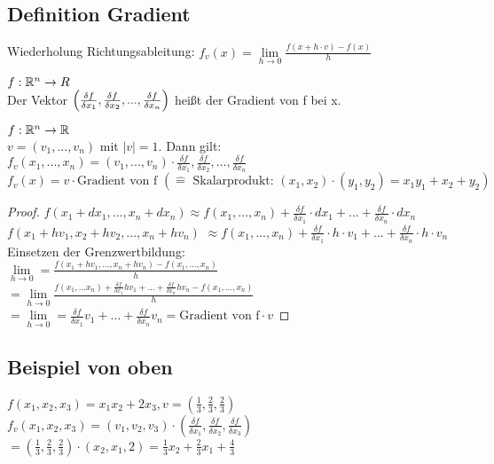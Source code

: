 \renewcommand{\ldate}{2015-10-08}

\subsection{Definition Gradient}
Wiederholung Richtungsableitung: $ f_v(x)=\lim\limits_{h\rightarrow 0} \frac{f(x+h\cdot v) - f(x)}{h}$
\begin{defi}
$ f: \mathbb{R}^n \rightarrow R $\\
Der Vektor $  \left( \frac{\delta f}{\delta x_1}, \frac{\delta f}{\delta x_2}, ..., \frac{\delta f}{\delta x_n}  \right) $ heißt der Gradient von f bei x.
\end{defi}

\begin{satz}
$ f: \mathbb{R}^n \rightarrow \mathbb{R} $\\
$ v = (v_1, ..., v_n) \textrm{ mit } |v|=1. $
Dann gilt: $ f_v(x_1, ..., x_n) = (v_1, ..., v_n) \cdot \frac{\delta f}{\delta x_1}, \frac{\delta f}{\delta x_2}, ..., \frac{\delta f}{\delta x_n} $\\
$ f_v(x) = v \cdot \textrm{Gradient von f } (\widehat{=} \textrm{ Skalarprodukt: } (x_1,x_2)\cdot (y_1,y_2)=x_1y_1+x_2+y_2) $ 
\end{satz}


\begin{proof}
$ f(x_1+dx_1, ..., x_n+dx_n) \approx f(x_1, ..., x_n) + \frac{\delta f}{\delta x_1} \cdot dx_1 + ... + \frac{\delta f}{\delta x_n} \cdot dx_n  $\\
$ f(x_1+h v_1,x_2+h v_2, ..., x_n+h v_n) $
$ \approx f(x_1, ..., x_n) + \frac{\delta f}{\delta x_1} \cdot h\cdot v_1 + ... + \frac{\delta f}{\delta x_n} \cdot h\cdot v_n $\\
Einsetzen der Grenzwertbildung:\\
$ \lim\limits_{h\rightarrow 0} = \frac{f(x_1+hv_1,...,x_n+hv_n) - f(x_1, ..., x_n)}{h} $
$ = \lim\limits_{h\rightarrow 0} \frac{f(x_1,...x_n)+\frac{\delta f}{\delta x_1}hv_1 + ... + \frac{\delta f}{\delta x_n}hv_n - f(x_1, ..., x_n)}{h} $ 
$ = \lim\limits_{h\rightarrow 0} = \frac{\delta f}{\delta x_1} v_1 + ... + \frac{\delta f}{\delta x_n} v_n = \textrm{Gradient von f} \cdot v $
\end{proof}

\subsection{Beispiel von oben}
$ f(x_1,x_2,x_3) = x_1x_2 + 2x_3, v=(\frac{1}{3}, \frac{2}{3}, \frac{2}{3}) $\\
$ f_v(x_1,x_2,x_3)=(v_1,v_2,v_3)\cdot (\frac{\delta f}{\delta x_1}, \frac{\delta f}{\delta x_2}, \frac{\delta f}{\delta x_3}) $
$ = (\frac{1}{3}, \frac{2}{3}, \frac{2}{3})\cdot (x_2, x_1, 2) = \frac{1}{3} x_2 + \frac{2}{3} x_1 + \frac{4}{3} $

